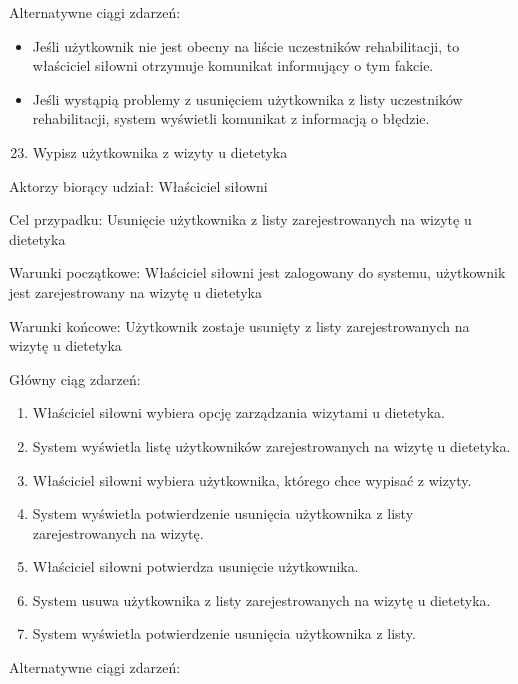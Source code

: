 \documentclass[
]{article}
\providecommand{\tightlist}{%
  \setlength{\itemsep}{0pt}\setlength{\parskip}{0pt}}
\begin{document}
{Alternatywne ciągi zdarzeń:}

\begin{itemize}
\tightlist
\item
  {Jeśli użytkownik nie jest obecny na liście uczestników rehabilitacji,
  to właściciel siłowni otrzymuje komunikat informujący o tym fakcie.}
\item
  {Jeśli wystąpią problemy z usunięciem użytkownika z listy uczestników
  rehabilitacji, system wyświetli komunikat z informacją o błędzie.}
\end{itemize}

{}

{}

\begin{enumerate}
\setcounter{enumi}{22}
\tightlist
\item
  {Wypisz użytkownika z wizyty u dietetyka}
\end{enumerate}

{Aktorzy biorący udział: Właściciel siłowni}

{Cel przypadku: Usunięcie użytkownika z listy zarejestrowanych na wizytę
u dietetyka}

{Warunki początkowe: Właściciel siłowni jest zalogowany do systemu,
użytkownik jest zarejestrowany na wizytę u dietetyka}

{Warunki końcowe: Użytkownik zostaje usunięty z listy zarejestrowanych
na wizytę u dietetyka}

{Główny ciąg zdarzeń:}

\begin{enumerate}
\tightlist
\item
  {Właściciel siłowni wybiera opcję zarządzania wizytami u dietetyka.}
\item
  {System wyświetla listę użytkowników zarejestrowanych na wizytę u
  dietetyka.}
\item
  {Właściciel siłowni wybiera użytkownika, którego chce wypisać z
  wizyty.}
\item
  {System wyświetla potwierdzenie usunięcia użytkownika z listy
  zarejestrowanych na wizytę.}
\item
  {Właściciel siłowni potwierdza usunięcie użytkownika.}
\item
  {System usuwa użytkownika z listy zarejestrowanych na wizytę u
  dietetyka.}
\item
  {System wyświetla potwierdzenie usunięcia użytkownika z listy.}
\end{enumerate}

{Alternatywne ciągi zdarzeń:}
\end{document}
